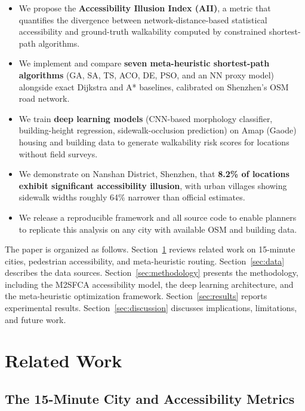 \documentclass[journal]{IEEEtran}
\begin{document}
\begin{itemize}
    \item We propose the \textbf{Accessibility Illusion Index (AII)}, a metric that quantifies the divergence between network-distance-based statistical accessibility and ground-truth walkability computed by constrained shortest-path algorithms.
    \item We implement and compare \textbf{seven meta-heuristic shortest-path algorithms} (GA, SA, TS, ACO, DE, PSO, and an NN proxy model) alongside exact Dijkstra and A* baselines, calibrated on Shenzhen's OSM road network.
    \item We train \textbf{deep learning models} (CNN-based morphology classifier, building-height regression, sidewalk-occlusion prediction) on Amap (Gaode) housing and building data to generate walkability risk scores for locations without field surveys.
    \item We demonstrate on Nanshan District, Shenzhen, that \textbf{8.2\% of locations exhibit significant accessibility illusion}, with urban villages showing sidewalk widths roughly 64\% narrower than official estimates.
    \item We release a reproducible framework and all source code to enable planners to replicate this analysis on any city with available OSM and building data.
\end{itemize}

The paper is organized as follows. Section~\ref{sec:related} reviews related work on 15-minute cities, pedestrian accessibility, and meta-heuristic routing. Section~\ref{sec:data} describes the data sources. Section~\ref{sec:methodology} presents the methodology, including the M2SFCA accessibility model, the deep learning architecture, and the meta-heuristic optimization framework. Section~\ref{sec:results} reports experimental results. Section~\ref{sec:discussion} discusses implications, limitations, and future work.

\section{Related Work}
\label{sec:related}

\subsection{The 15-Minute City and Accessibility Metrics}
\end{document}
